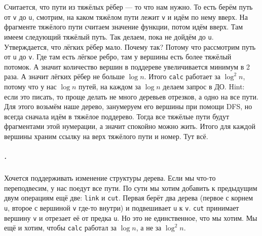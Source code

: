\documentclass{article}
\newcommand{\pseudo}{PseudoLexer.py:PseudoLexer -x}
\newcommand{\pseudocode}[1]{\texttt{#1}}
\begin{document}
    Считается, что пути из тяжёлых рёбер --- то что нам нужно. То есть берём путь от \pseudocode{v} до \pseudocode{u}, смотрим, на каком тяжёлом пути лежит \pseudocode{v} и идём по нему вверх. На фрагменте тяжёлого пути считаем значение функции, потом идём вверх. Там имеем следующий тяжёлый путь. Так делаем, пока не дойдём до \pseudocode{u}. Утверждается, что лёгких рёбер мало. Почему так? Потому что рассмотрим путь от \pseudocode{u} до \pseudocode{v}. Где там есть лёгкое ребро, там у вершины есть более тяжёлый потомок. А значит количество вершин в поддереве увеличивается минимум в 2 раза. А значит лёгких рёбер не больше $\log n$. Итого \pseudocode{calc} работает за $\log^2n$, потому что у нас $\log n$ путей, на каждом за $\log n$ делаем запрос в ДО. Hint: если это писать, то проще делать не много деревьев отрезков, а одно на все пути. Для этого возьмём наше дерево, занумеруем его вершины при помощи DFS, но всегда сначала идём в тяжёлое поддерево. Тогда все тяжёлые пути будут фрагментами этой нумерации, а значит спокойно можно жить. Итого для каждой вершины храним ссылку на верх тяжёлого пути и номер. Тут всё.
    \subparagraph{.}
    Хочется поддерживать изменение структуры дерева. Если мы что-то переподвесим, у нас поедут все пути. По сути мы хотим добавить к предыдущим двум операциям ещё две: \pseudocode{link} и \pseudocode{cut}. Первая берёт два дерева (первое с корнем \pseudocode{u}, второе с вершиной \pseudocode{v} где-то внутри) и подвешивает \pseudocode{u} к \pseudocode{v}. \pseudocode{cut} принимает вершину \pseudocode{v} и отрезает её от предка \pseudocode{u}. Но это не единственное, что мы хотим. Мы ещё и хотим, чтобы \pseudocode{calc} работал за $\log n$, а не за $\log^2n$.
    \begin{figure}[H]
    \end{figure}\noindent
\end{document}
